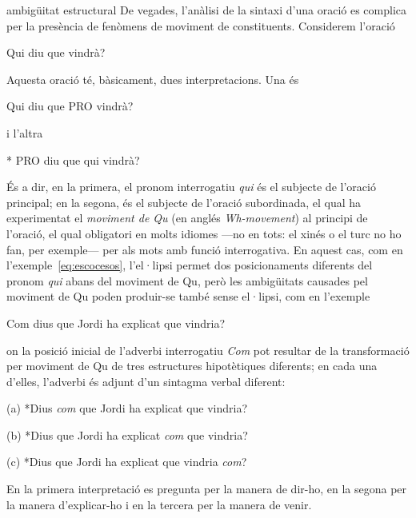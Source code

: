 \begin{enumerate}
\begin{persabermes}{ambigüitat estructural}
De vegades, l'anàlisi de la sintaxi d'una oració es complica per la
  presència de fenòmens de moviment de constituents. Considerem
  l'oració
\begin{example}
Qui diu que vindrà?
\end{example}
Aquesta oració té, bàsicament, dues interpretacions. Una és
\begin{example}
Qui diu que PRO vindrà?
\end{example}
i l'altra
\begin{example}
* PRO diu que qui vindrà?
\end{example}
És a dir, en la primera, el pronom interrogatiu \emph{qui} és el
subjecte de l'oració principal; en la segona, és el subjecte de
l'oració subordinada, el qual ha experimentat el \emph{moviment de Qu}
(en anglés \emph{Wh-movement}) al principi de l'oració, el qual
obligatori en molts idiomes ---no en tots: el xinés o el turc no ho
fan, per exemple--- per als mots amb funció interrogativa. En aquest
cas, com en l'exemple~\ref{eq:escocesos}, l'el·lipsi permet dos
posicionaments diferents del pronom \emph{qui} abans del moviment de
Qu, però les ambigüitats causades pel moviment de Qu poden produir-se
també sense el·lipsi, com en l'exemple
\begin{exemple}
Com dius que Jordi ha explicat que vindria?
\end{exemple}
on la posició inicial de l'adverbi interrogatiu \emph{Com} pot
resultar de la transformació per moviment de Qu de tres estructures
hipotètiques diferents; en cada una d'elles, l'adverbi és adjunt d'un
sintagma verbal diferent:
  \begin{exemple}
  \item[(a)] *Dius \emph{com} que Jordi ha explicat que vindria?
  \item[(b)] *Dius que Jordi ha explicat \emph{com} que vindria?
  \item[(c)] *Dius que Jordi ha explicat que vindria \emph{com}?
  \end{exemple}
  En la primera interpretació es pregunta per la manera de dir-ho, en
  la segona per la manera d'explicar-ho i en la tercera per la manera
  de venir.
  

\end{persabermes}
\end{enumerate}
